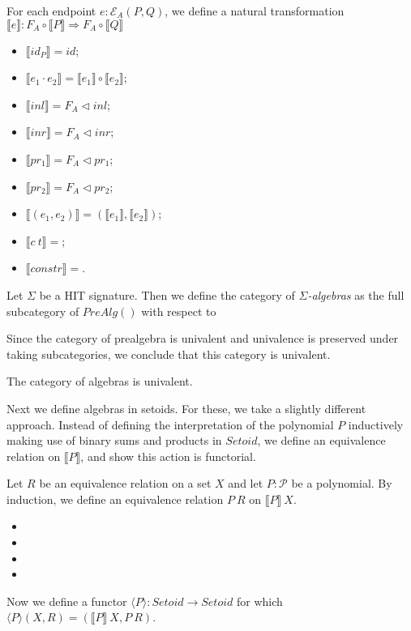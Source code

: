 \documentclass[9pt]{entcs}
\newcommand{\constructor}[1]{#1}
\newcommand{\category}[1]{#1}
\newcommand{\nattranstxt}[1]{#1}
\newcommand{\1}{\type{1}} %
\newcommand{\setoids}{\category{Setoid}}
\newcommand{\functor}[2]{#1 \rightarrow #2} %
\newcommand{\compf}[2]{#1 \circ #2} %
\newcommand{\nattrans}[2]{#1 \Rightarrow #2} %
\newcommand{\idt}[1]{\nattranstxt{id}} %
\newcommand{\compt}[2]{#1 \circ #2} %
\newcommand{\lwhisker}[2]{#1 \vartriangleleft #2} %
\newcommand{\inlt}{\nattranstxt{inl}} %
\newcommand{\inrt}{\nattranstxt{inr}} %
\newcommand{\prlt}{\nattranstxt{pr}_1} %
\newcommand{\prrt}{\nattranstxt{pr}_2} %
\newcommand{\pairt}[2]{(#1 , #2)} %
\newcommand{\poly}{\mathcal{P}} %
\newcommand{\ep}[3]{\mathcal{E}_{#1}(#2,#3)} %
\newcommand{\id}[1]{\constructor{id}_{#1}} %
\newcommand{\comp}[2]{#1 \cdot #2} %
\newcommand{\inle}{\constructor{inl}} %
\newcommand{\inre}{\constructor{inr}} %
\newcommand{\prle}{\constructor{pr}_1} %
\newcommand{\prre}{\constructor{pr}_2} %
\newcommand{\pair}[2]{(#1 , #2)} %
\newcommand{\Ce}{\constructor{c}} %
\newcommand{\constr}{\constructor{constr}} %
\newcommand{\semP}[1]{\llbracket #1 \rrbracket} %
\newcommand{\prealg}[1]{\category{PreAlg}(#1)} %
\newcommand{\forget}[1]{F_{#1}} %
\newcommand{\semE}[1]{\llbracket #1 \rrbracket} %
\newcommand{\semPT}[1]{\langle #1 \rangle} %
\begin{document}
\begin{definition}
For each endpoint $e : \ep{A}{P}{Q}$, we define a natural transformation $\semE{e} : \nattrans{\compf{\forget{A}}{\semP{P}}} {\compf{\forget{A}}{\semP{Q}}}$
\begin{itemize}
	\item $\semE{\id{P}} = \idt{\compf{\forget{A}}{\semP{P}}}$;
	\item $\semE{\comp{e_1}{e_2}} = \compt{\semE{e_1}}{\semE{e_2}}$;
	\item $\semE{\inle} = \lwhisker{\forget{A}}{\inlt}$;
	\item $\semE{\inre} = \lwhisker{\forget{A}}{\inrt}$;
	\item $\semE{\prle} = \lwhisker{\forget{A}}{\prlt}$;
	\item $\semE{\prre} = \lwhisker{\forget{A}}{\prrt}$;
	\item $\semE{\pair{e_1}{e_2}} = \pairt{\semE{e_1}}{\semE{e_2}}$;
	\item $\semE{\Ce \> t} = $;
	\item $\semE{\constr} = $.
\end{itemize}
\end{definition}

\begin{definition}
Let $\Sigma$ be a HIT signature.
Then we define the category of \emph{$\Sigma$-algebras} as the full subcategory of $\prealg{}$ with respect to
\end{definition}

Since the category of prealgebra is univalent and univalence is preserved under taking subcategories, we conclude that this category is univalent.

\begin{proposition}
The category of algebras is univalent.
\end{proposition}

Next we define algebras in setoids.
For these, we take a slightly different approach.
Instead of defining the interpretation of the polynomial $P$ inductively making use of binary sums and products in $\setoids$, we define an equivalence relation on $\semP{P}$, and show this action is functorial.

\begin{definition}
Let $R$ be an equivalence relation on a set $X$ and let $P : \poly$ be a polynomial.
By induction, we define an equivalence relation $P \> R$ on $\semP{P} \> X$.
\begin{itemize}
	\item
	\item
	\item
	\item
\end{itemize}
Now we define a functor $\semPT{P} : \functor{\setoids}{\setoids}$ for which $\semPT{P}(X,R) = (\semP{P} \> X, P \> R)$.
\end{definition}
\end{document}
